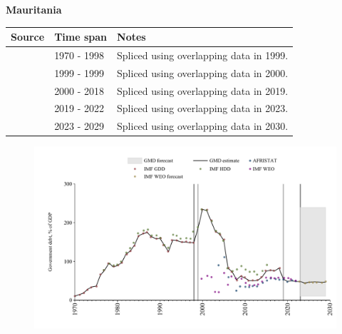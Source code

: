 \documentclass[12pt,a4paper,landscape]{article}
\begin{document}
\begin{adjustbox}{max totalsize={\paperwidth}{\paperheight},center}
\begin{minipage}[t][\textheight][t]{\textwidth}
\vspace*{0.5cm}
{}
\begin{center}
{\Large\bfseries Mauritania}
\end{center}
\vspace{0.5cm}
\begin{table}[H]
\centering
\small
\begin{tabular}{|l|l|l|}
\hline
\textbf{Source} & \textbf{Time span} & \textbf{Notes} \\
\hline
\rowcolor{white}\cite{IMF_GDD}& 1970 - 1998 &Spliced using overlapping data in 1999.\\
\rowcolor{lightgray}\cite{IMF_HDD}& 1999 - 1999 &Spliced using overlapping data in 2000.\\
\rowcolor{white}\cite{IMF_GDD}& 2000 - 2018 &Spliced using overlapping data in 2019.\\
\rowcolor{lightgray}\cite{AFRISTAT}& 2019 - 2022 &Spliced using overlapping data in 2023.\\
\rowcolor{white}\cite{IMF_WEO_forecast}& 2023 - 2029 &Spliced using overlapping data in 2030.\\
\hline
\end{tabular}
\end{table}
\begin{figure}[H]
\centering
\includegraphics[width=\textwidth,height=0.6\textheight,keepaspectratio]{graphs/MRT_govdebt_GDP.pdf}
\end{figure}
\end{minipage}
\end{adjustbox}
\end{document}
